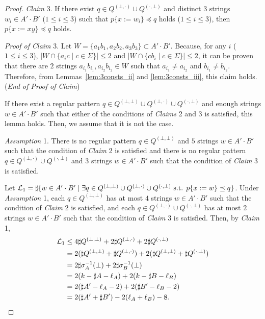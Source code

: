 \begin{proof}
\smallskip

\noindent
\textit{Claim} 3. If there exist $q \in Q^{(\bot,\cdot)} \cup Q^{(\cdot,\bot)}$ and distinct $3$ strings $w_{i} \in A'\cdot B'$ ($1\leq i\leq 3$) such that $p \{ x:=w_{i} \} \preceq q$ holds ($1\leq i\leq 3$),  then $p \{ x:=xy \} \preceq q$ holds.

\noindent
\textit{Proof of Claim} 3.
Let $W = \{a_{1}b_{1},a_{2}b_{2},a_{3}b_{3}\} \subset A'\cdot B'$.
Because, for any $i$ ($1\leq i\leq 3$), $|W \cap \{a_{i}c \mid c \in \Sigma\}| \leq 2$ and  $|W \cap \{cb_{i} \mid c \in \Sigma\}| \leq 2$, it can be proven that there are $2$ strings $a_{i_{1}}b_{i_{1}},a_{i_{2}}b_{i_{2}}\in W$ such that $a_{i_{1}} \not= a_{i_{2}}$ and $b_{i_{1}} \not= b_{i_{2}}$.
Therefore, from Lemmas~\ref{lem:3consts_ii} and \ref{lem:3consts_iii}, this claim holds. (\textit{End of Proof of Claim})

\smallskip

\noindent
If there exist a regular pattern $q \in Q^{(\bot,\bot)} \cup Q^{(\bot,\cdot)} \cup Q^{(\cdot,\bot)}$ and enough strings $w \in A'\cdot B'$ such that either of the conditions of \textit{Claims} 2 and 3 is satisfied, this lemma holds. Then, we assume that it is not the case.

\smallskip

\noindent
\textit{Assumption} 1.
There is no regular pattern $q \in Q^{(\bot,\bot)}$ and $5$ strings $w \in A'\cdot B'$ such that the condition of \textit{Claim} 2 is satisfied and there is no regular pattern $q \in Q^{(\bot,\cdot)} \cup Q^{(\cdot,\bot)}$ and $3$ strings $w \in A'\cdot B'$ such that the condition of \textit{Claim} 3 is satisfied.

\smallskip

\noindent
Let ${\cal L}_{1} = \sharp\{w \in A'\cdot B' \mid \exists q \in Q^{(\bot,\bot)} \cup Q^{(\bot,\cdot)} \cup Q^{(\cdot,\bot)} \mbox{ s.t. } p\{x:=w\} \preceq q\}$.
Under \textit{Assumption} 1, each $q\in Q^{(\bot,\bot)}$ has at most $4$ strings $w \in A'\cdot B'$ such that the condition of \textit{Claim} 2 is satisfied, and each $q \in Q^{(\bot,\cdot)} \cup Q^{(\cdot,\bot)}$ has at most $2$ strings $w \in A'\cdot B'$ such that the condition of \textit{Claim} 3 is satisfied.
Then, by \textit{Claim} 1,
\begin{align*}
  {\cal L}_{1} &\leq 4\sharp Q^{(\bot,\bot)} + 2\sharp Q^{(\bot,\cdot)} + 2\sharp Q^{(\cdot,\bot)}\\
  & = 2(\sharp Q^{(\bot,\bot)} + \sharp Q^{(\bot,\cdot)}) + 2(\sharp Q^{(\bot,\bot)} + \sharp Q^{(\cdot,\bot)})\\
  & = 2\sharp \sigma_{A}^{-1}(\bot) + 2\sharp \sigma_{B}^{-1}(\bot)\\
  & = 2(k - \sharp A - \ell_{A}) + 2(k - \sharp B - \ell_{B})\\
  & = 2(\sharp A' - \ell_{A} - 2) + 2(\sharp B' - \ell_{B} - 2)\\
  & = 2(\sharp A' + \sharp B') - 2(\ell_{A} + \ell_{B}) - 8.
\end{align*}


\end{proof}
